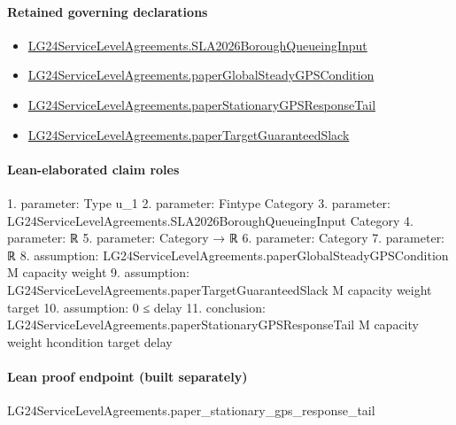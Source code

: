 \documentclass[10pt]{article}
\begin{document}
\paragraph{Retained governing declarations}
\begin{itemize}\raggedright
\item \hyperlink{governing-declaration-3e29dad51cd2861a}{LG24\allowbreak{}Service\allowbreak{}Level\allowbreak{}Agreements.\allowbreak{}SLA2026\allowbreak{}Borough\allowbreak{}Queueing\allowbreak{}Input}
\item \hyperlink{governing-declaration-fd4f3a4664a047fb}{LG24\allowbreak{}Service\allowbreak{}Level\allowbreak{}Agreements.\allowbreak{}paper\allowbreak{}Global\allowbreak{}Steady\allowbreak{}GPS\allowbreak{}Condition}
\item \hyperlink{governing-declaration-0e90dd519a9eb770}{LG24\allowbreak{}Service\allowbreak{}Level\allowbreak{}Agreements.\allowbreak{}paper\allowbreak{}Stationary\allowbreak{}GPS\allowbreak{}Response\allowbreak{}Tail}
\item \hyperlink{governing-declaration-9ab11744ce98f28c}{LG24\allowbreak{}Service\allowbreak{}Level\allowbreak{}Agreements.\allowbreak{}paper\allowbreak{}Target\allowbreak{}Guaranteed\allowbreak{}Slack}
\end{itemize}
\paragraph{Lean-elaborated claim roles}\begin{ReviewVerbatim}
1. parameter: Type u_1
2. parameter: Fintype Category
3. parameter: LG24ServiceLevelAgreements.SLA2026BoroughQueueingInput Category
4. parameter: ℝ
5. parameter: Category → ℝ
6. parameter: Category
7. parameter: ℝ
8. assumption: LG24ServiceLevelAgreements.paperGlobalSteadyGPSCondition M capacity weight
9. assumption: LG24ServiceLevelAgreements.paperTargetGuaranteedSlack M capacity weight target
10. assumption: 0 ≤ delay
11. conclusion: LG24ServiceLevelAgreements.paperStationaryGPSResponseTail M capacity weight hcondition target delay
\end{ReviewVerbatim}

\paragraph{Lean proof endpoint (built separately)}\begin{ReviewVerbatim}
LG24ServiceLevelAgreements.paper_stationary_gps_response_tail
\end{ReviewVerbatim}
\end{document}
